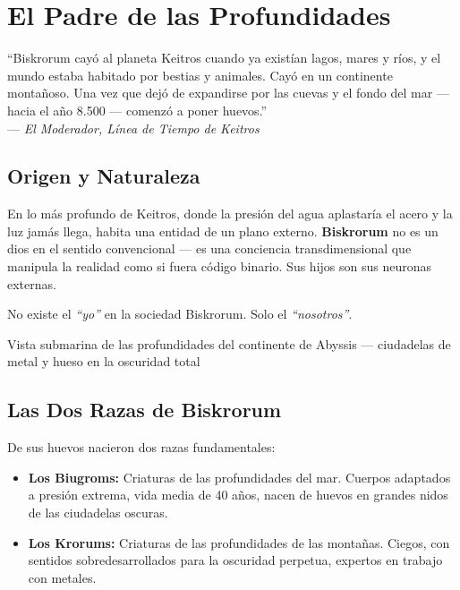 \chapter*{El Padre de las Profundidades}

\begin{loreblock}
``Biskrorum cayó al planeta Keitros cuando ya existían lagos, mares y ríos, y el mundo estaba habitado por bestias y animales. Cayó en un continente montañoso. Una vez que dejó de expandirse por las cuevas y el fondo del mar — hacia el año 8.500 — comenzó a poner huevos.''\\[4pt]
\hfill — \textit{El Moderador, Línea de Tiempo de Keitros}
\end{loreblock}

\vspace{0.4cm}

\section*{Origen y Naturaleza}

En lo más profundo de Keitros, donde la presión del agua aplastaría el acero y la luz jamás llega, habita una entidad de un plano externo. \textbf{Biskrorum} no es un dios en el sentido convencional — es una conciencia transdimensional que manipula la realidad como si fuera código binario. Sus hijos son sus neuronas externas.

No existe el \textit{``yo''} en la sociedad Biskrorum. Solo el \textit{``nosotros''}.

\begin{imagebox}{Vista submarina de las profundidades del continente de Abyssis — ciudadelas de metal y hueso en la oscuridad total}
    \vspace{3cm}
\end{imagebox}

\section*{Las Dos Razas de Biskrorum}

De sus huevos nacieron dos razas fundamentales:

\begin{itemize}
    \item \textbf{Los Biugroms:} Criaturas de las profundidades del mar. Cuerpos adaptados a presión extrema, vida media de 40 años, nacen de huevos en grandes nidos de las ciudadelas oscuras.
    \item \textbf{Los Krorums:} Criaturas de las profundidades de las montañas. Ciegos, con sentidos sobredesarrollados para la oscuridad perpetua, expertos en trabajo con metales.
\end{itemize}


